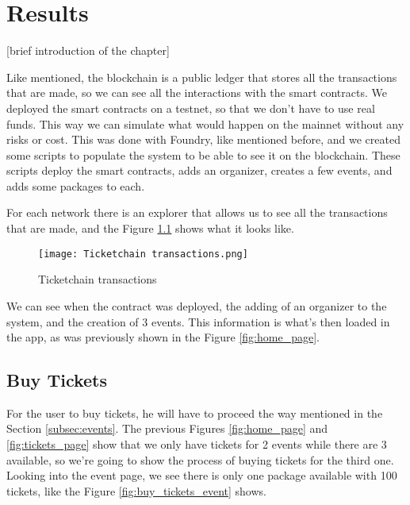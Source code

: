 \chapter{Results}
\label{ch:results}

[brief introduction of the chapter]


Like mentioned, the blockchain is a public ledger that stores all the
transactions that are made, so we can see all the interactions with the smart
contracts. We deployed the smart contracts on a testnet, so that we don't have
to use real funds. This way we can simulate what would happen on the mainnet
without any risks or cost. This was done with Foundry, like mentioned before,
and we created some scripts to populate the system to be able to see it on the
blockchain. These scripts deploy the smart contracts, adds an organizer,
creates a few events, and adds some packages to each.

For each network there is an explorer that allows us to see all the
transactions that are made, and the Figure \ref{fig:ticketchain_transactions}
shows what it looks like.
\begin{figure}[H]
    \texttt{[image: Ticketchain transactions.png]}
    \centering
    \caption{Ticketchain transactions}
    \label{fig:ticketchain_transactions}
\end{figure}

We can see when the contract was deployed, the adding of an organizer to the
system, and the creation of 3 events. This information is what's then loaded in
the app, as was previously shown in the Figure \ref{fig:home_page}.

\section{Buy Tickets}
\label{sec:buy_tickets}

For the user to buy tickets, he will have to proceed the way mentioned in the
Section \ref{subsec:events}. The previous Figures \ref{fig:home_page} and
\ref{fig:tickets_page} show that we only have tickets for 2 events while there
are 3 available, so we're going to show the process of buying tickets for the
third one. Looking into the event page, we see there is only one package
available with 100 tickets, like the Figure \ref{fig:buy_tickets_event} shows.

